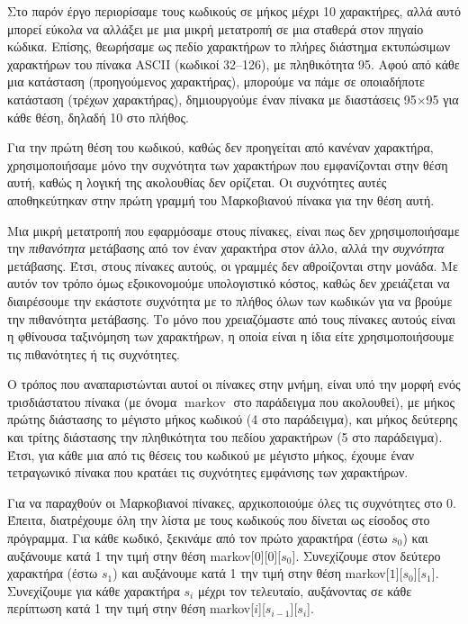 \documentclass[11pt]{article}
\newcommand*{\var}[1]{\operatorname{#1}}
\begin{document}
Στο παρόν έργο περιορίσαμε τους κωδικούς σε μήκος μέχρι 10 χαρακτήρες, αλλά αυτό μπορεί εύκολα να αλλάξει με μια μικρή μετατροπή σε μια σταθερά στον πηγαίο κώδικα. Επίσης, θεωρήσαμε ως πεδίο χαρακτήρων το πλήρες διάστημα εκτυπώσιμων χαρακτήρων του πίνακα ASCII (κωδικοί 32--126), με πληθικότητα 95. Αφού από κάθε μια κατάσταση (προηγούμενος χαρακτήρας), μπορούμε να πάμε σε οποιαδήποτε κατάσταση (τρέχων χαρακτήρας), δημιουργούμε έναν πίνακα με διαστάσεις 95$\times$95 για κάθε θέση, δηλαδή 10 στο πλήθος.

Για την πρώτη θέση του κωδικού, καθώς δεν προηγείται από κανέναν χαρακτήρα, χρησιμοποιήσαμε μόνο την συχνότητα των χαρακτήρων που εμφανίζονται στην θέση αυτή, καθώς η λογική της ακολουθίας δεν ορίζεται. Οι συχνότητες αυτές αποθηκεύτηκαν στην πρώτη γραμμή του Μαρκοβιανού πίνακα για την θέση αυτή.

Μια μικρή μετατροπή που εφαρμόσαμε στους πίνακες, είναι πως δεν χρησιμοποιήσαμε την \textit{πιθανότητα} μετάβασης από τον έναν χαρακτήρα στον άλλο, αλλά την \textit{συχνότητα} μετάβασης. Έτσι, στους πίνακες αυτούς, οι γραμμές δεν αθροίζονται στην μονάδα. Με αυτόν τον τρόπο όμως εξοικονομούμε υπολογιστικό κόστος, καθώς δεν χρειάζεται να διαιρέσουμε την εκάστοτε συχνότητα με το πλήθος όλων των κωδικών για να βρούμε την πιθανότητα μετάβασης. Το μόνο που χρειαζόμαστε από τους πίνακες αυτούς είναι η φθίνουσα ταξινόμηση των χαρακτήρων, η οποία είναι η ίδια είτε χρησιμοποιήσουμε τις πιθανότητες ή τις συχνότητες.

Ο τρόπος που αναπαριστώνται αυτοί οι πίνακες στην μνήμη, είναι υπό την μορφή ενός τρισδιάστατου πίνακα (με όνομα $\var{markov}$ στο παράδειγμα που ακολουθεί), με μήκος πρώτης διάστασης το μέγιστο μήκος κωδικού (4 στο παράδειγμα), και μήκος δεύτερης και τρίτης διάστασης την πληθικότητα του πεδίου χαρακτήρων (5 στο παράδειγμα). Έτσι, για κάθε μια από τις θέσεις του κωδικού με μέγιστο μήκος, έχουμε έναν τετραγωνικό πίνακα που κρατάει τις συχνότητες εμφάνισης των χαρακτήρων.

Για να παραχθούν οι Μαρκοβιανοί πίνακες, αρχικοποιούμε όλες τις συχνότητες στο 0. Έπειτα, διατρέχουμε όλη την λίστα με τους κωδικούς που δίνεται ως είσοδος στο πρόγραμμα. Για κάθε κωδικό, ξεκινάμε από τον πρώτο χαρακτήρα (έστω $s_0$) και αυξάνουμε κατά 1 την τιμή στην θέση markov[$0$][$0$][$s_0$]. Συνεχίζουμε στον δεύτερο χαρακτήρα (έστω $s_1$) και αυξάνουμε κατά 1 την τιμή στην θέση markov[$1$][$s_0$][$s_1$]. Συνεχίζουμε για κάθε χαρακτήρα $s_i$ μέχρι τον τελευταίο, αυξάνοντας σε κάθε περίπτωση κατά 1 την τιμή στην θέση markov[$i$][$s_{i-1}$][$s_i$].
\end{document}
